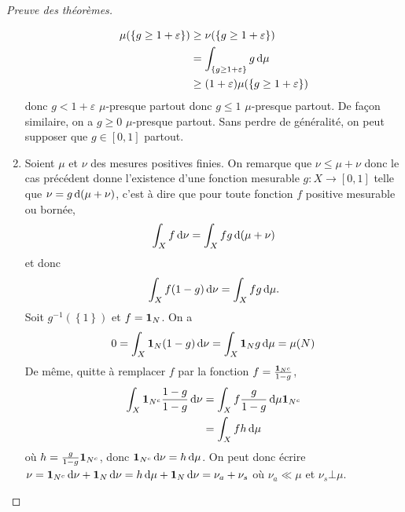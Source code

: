 \begin{proof}[Preuve des théorèmes]
\begin{enumerate}
\begin{align*}
\mu(\{g\geq 1+\varepsilon\})& \geq \nu(\{g\geq 1+\varepsilon\})\\
                            &= \int_{\{g\geq 1+\varepsilon\}}g\mathop{}\!\mathrm d\mu \\&\geq (1+\varepsilon)\mu(\{g\geq 1+\varepsilon\})
\end{align*}
donc $g< 1+\varepsilon$ $\mu$-presque partout donc $g\leq 1$ $\mu$-presque partout.
De façon similaire, on a $g\geq 0$ $\mu$-presque partout.
Sans perdre de généralité, on peut supposer que $g\in [0,1]$ partout.
\item 
    Soient $\mu$ et $\nu$ des mesures positives finies.
On remarque que $\nu\leq \mu+\nu$ donc le cas précédent donne l'existence d'une fonction mesurable $g:X\to [0,1]$ telle que $\nu= g\mathop{}\!\mathrm d(\mu+\nu)$, c'est à dire que pour toute fonction $f$ positive mesurable ou bornée, 
\[\int_X f\mathop{}\!\mathrm d\nu= \int_X fg\mathop{}\!\mathrm d(\mu+\nu)\]
et donc  \[\int_X f(1-g)\mathop{}\!\mathrm d\nu =\int_Xfg \mathop{}\!\mathrm d\mu.\]
Soit $g^{-1}(\left\{ 1 \right\} )$ et 
$f= \bm{1}_N$. On a \[0=\int_X \bm{1}_N(1-g)\mathop{}\!\mathrm d\nu = \int_X \bm{1}_N g\mathop{}\!\mathrm d\mu = \mu(N)\]
De même, quitte à remplacer $f$ par la fonction $f=\frac{\bm{1}_{N^c}}{1-g}$, 
    \begin{align*}
    \int_X \bm{1}_{N^c} \frac{{1-g}}{{1-g}}\mathop{}\!\mathrm d\nu &= \int_Xf \frac{g}{1-g}\mathop{}\!\mathrm d\mu \bm{1}_{N^c}\\
&= \int_X f h\mathop{}\!\mathrm d\mu
    \end{align*} 
où $h=\frac{g}{1-g}\bm{1}_{N^c}$, 
donc $\bm{1}_{N^c}\mathop{}\!\mathrm d\nu=h \mathop{}\!\mathrm d\mu$. On peut donc écrire $\nu= \bm{1}_{N^c}\mathop{}\!\mathrm d\nu +\bm{1}_N\mathop{}\!\mathrm d\nu = h\mathop{}\!\mathrm d\mu + \bm{1}_N \mathop{}\!\mathrm d\nu = \nu_a + \nu_s$
où $\nu_a \ll \mu$ et $\nu_s \bot \mu$.


\end{enumerate}
\end{proof}
